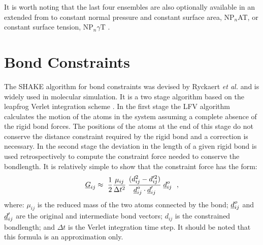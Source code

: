 It is worth noting that the last four ensembles are also optionally
available in an extended from to constant normal pressure and
constant surface area, NP$_{n}$AT, or constant surface tension,
NP$_{n}\gamma$T \cite{ikeguchi-04a}.

\section{Bond Constraints}
\label{shake-rattle}

The SHAKE algorithm  for bond constraints
was devised by Ryckaert {\em et al.} \cite{ryckaert-77a} and is
widely used in molecular simulation.  It is a two stage algorithm
based on the leapfrog Verlet integration
scheme \cite{allen-89a}.  In the first stage the LFV algorithm
calculates the motion of the atoms in the system assuming a
complete absence of the rigid bond
forces. The positions of the atoms at the end of this stage
do not conserve the distance constraint required by the
rigid bond and a correction is necessary.
In the second stage the deviation in the length of a given
rigid bond is used retrospectively to
compute the constraint force needed to conserve the bondlength.
It is relatively simple to show that the constraint force has the form:
\begin{equation}
\mbox{$\underline{G}$}_{ij} \approx\ {1 \over 2} {\mu_{ij} \over \Delta t^{2}} \;
{(d_{ij}^{2} - d_{ij}'^{2}) \over \mbox{$\underline{d}$}_{ij}^{o} \cdot
\mbox{$\underline{d}$}_{ij}'} \; \mbox{$\underline{d}$}_{ij}^{o}~~, \label{g12}
\end{equation}
where: $\mu_{ij}$ is the reduced mass of the two atoms connected
by the bond; $\mbox{$\underline{d}$}_{ij}^{o}$ and $\mbox{$\underline{d}$}_{ij}'$ are the
original and intermediate bond vectors; $d_{ij}$ is the
constrained bondlength; and $\Delta t$ is the
Verlet integration time step.  It should
be noted that this formula is an approximation only.

